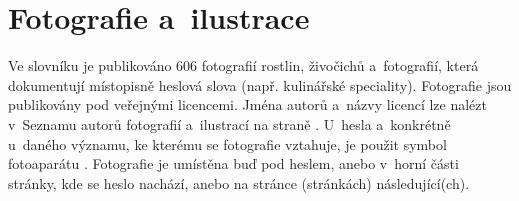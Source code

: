 \section{Fotografie a~ilustrace}

Ve slovníku je publikováno 606 fotografií rostlin, živočichů a~fotografií, která dokumentují místopisně heslová slova (např. kulinářské speciality).
Fotografie jsou publikovány pod veřejnými licencemi. Jména autorů a~názvy licencí lze nalézt v~Seznamu autorů fotografií a~ilustrací na straně \pageref{sec:photo}. U~hesla a~konkrétně u~daného významu, ke kterému se fotografie vztahuje, je použit symbol fotoaparátu \dicsymPhoto. Fotografie je umístěna buď pod heslem, anebo v~horní části stránky, kde se heslo nachází, anebo na stránce (stránkách) následující(ch).

